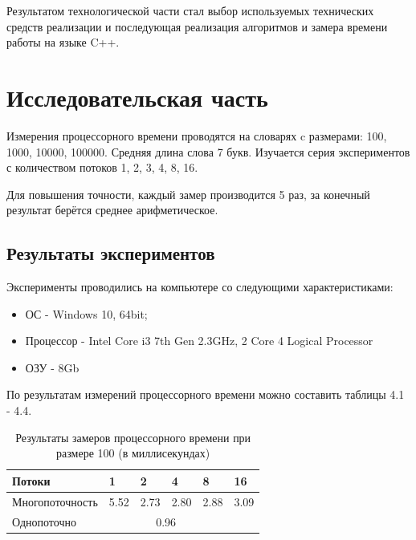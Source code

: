 \documentclass[12pt,a4paper]{report}
\begin{document}
Результатом технологической части стал выбор используемых технических средств 
реализации и последующая реализация алгоритмов и замера 
времени работы на языке C++.

\chapter{Исследовательская часть} 

Измерения процессорного времени проводятся на словарях c размерами: 
100, 1000, 10000, 100000. Средняя длина слова 7 букв.
Изучается серия экспериментов с количеством потоков 1, 2, 3, 4, 8, 16.

Для повышения точности, каждый замер производится 5 раз, за конечный результат 
берётся среднее арифметическое.

\section{Результаты экспериментов}

Эксперименты проводились на компьютере со следующими характеристиками:
\begin{itemize}
    \item ОС - Windows 10, 64bit;
    \item Процессор - Intel Core i3 7th Gen 2.3GHz, 2 Core 4 Logical Processor
    \item ОЗУ - 8Gb
\end{itemize}

По результатам измерений процессорного времени можно составить таблицы 4.1 - 4.4.

\begin{table}[h!]
\caption{Результаты замеров процессорного времени при размере 100 (в миллисекундах)}
\label{tabular:timesandtenses}
\begin{center}
\begin{tabular}{ | l | l | l | l | l | l | }
\hline
        Потоки                   & 1    & 2    & 4    & 8    & 16      \\ \hline
        Многопоточность  & 5.52 & 2.73 & 2.80 & 2.88 & 3.09  \\ \hline
        Однопоточно              &      \multicolumn{4}{c}{0.96}   &  \\ \hline
\end{tabular}
\end{center}
\end{table}
\end{document}
